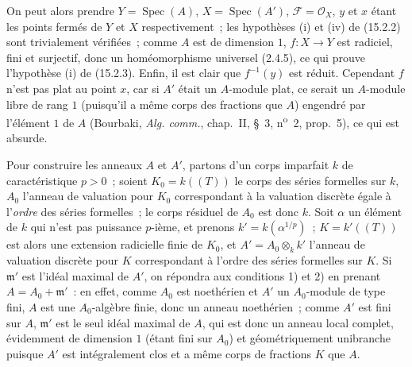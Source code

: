 \begin{remarks}[15.2.4]
\begin{enumerate}[label=(\roman*)]
  On peut alors prendre $Y=\operatorname{Spec}(A)$,
  $X=\operatorname{Spec}(A')$, $\mathcal F=\mathcal O_X$, $y$ et $x$ étant les
  points fermés de $Y$ et $X$ respectivement~; les hypothèses (i) et (iv) de
  (15.2.2) sont trivialement vérifiées~; comme $A$ est de dimension $1$,
  $f:X\to Y$ est radiciel, fini et surjectif, donc un homéomorphisme universel
  (2.4.5), ce qui prouve l'hypothèse (i) de (15.2.3). Enfin, il est clair que
  $f^{-1}(y)$ est réduit. Cependant $f$ n'est pas plat au point $x$, car si $A'$
  était un $A$-module plat, ce serait un $A$-module libre de rang $1$ (puisqu'il
  a même corps des fractions que $A$) engendré par l'élément $1$ de $A$
  (Bourbaki, \emph{Alg. comm.}, chap.~II, \S~3, n\textsuperscript{o}~2,
  prop.~5), ce qui est absurde.

  Pour construire les anneaux $A$ et $A'$, partons d'un corps imparfait $k$ de
  caractéristique $p>0$~; soient $K_0=k((T))$ le corps des séries formelles sur
  $k$, $A_0$ l'anneau de valuation pour $K_0$ correspondant à la valuation
  discrète égale à l'\emph{ordre} des séries formelles~; le corps résiduel de
  $A_0$ est donc $k$. Soit $\alpha$ un élément de $k$ qui n'est pas puissance
  $p$-ième, et prenons $k'=k(\alpha^{1/p})$~; $K=k'((T))$ est alors une extension
  radicielle finie de $K_0$, et $A'=A_0\otimes_k k'$ l'anneau de valuation
  discrète pour $K$ correspondant à l'ordre des séries formelles sur $K$. Si
  $\mathfrak m'$ est l'idéal maximal de $A'$, on répondra aux conditions 1) et 2)
  en prenant $A=A_0+\mathfrak m'$~: en effet, comme $A_0$ est noethérien et $A'$
  un $A_0$-module de type fini, $A$ est une $A_0$-algèbre finie, donc un anneau
  noethérien~; comme $A'$ est fini sur $A$, $\mathfrak m'$ est le seul idéal
  maximal de $A$, qui est donc un anneau local complet, évidemment de dimension
  $1$ (étant fini sur $A_0$) et géométriquement unibranche puisque $A'$ est
  intégralement clos et a même corps de fractions $K$ que $A$.


\end{enumerate}
\end{remarks}
